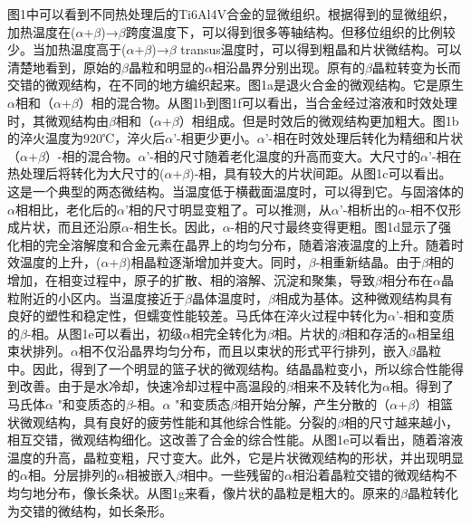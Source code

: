 图1中可以看到不同热处理后的Ti6Al4V合金的显微组织。根据得到的显微组织，加热温度在($\alpha$+$\beta$)→$\beta$跨度温度下，可以得到很多等轴结构。但移位组织的比例较少。当加热温度高于($\alpha$+$\beta$)→$\beta$ transus温度时，可以得到粗晶和片状微结构。可以清楚地看到，原始的$\beta$晶粒和明显的$\alpha$相沿晶界分别出现。原有的$\beta$晶粒转变为长而交错的微观结构，在不同的地方编织起来。图1a是退火合金的微观结构。它是原生$\alpha$相和（$\alpha$+$\beta$）相的混合物。从图1b到图1f可以看出，当合金经过溶液和时效处理时，其微观结构由$\beta$相和（$\alpha$+$\beta$）相组成。但是时效后的微观结构更加粗大。图1b的淬火温度为920℃，淬火后$\alpha$'-相更少更小。$\alpha$'-相在时效处理后转化为精细和片状（$\alpha$+$\beta$）-相的混合物。$\alpha$'-相的尺寸随着老化温度的升高而变大。大尺寸的$\alpha$'-相在热处理后将转化为大尺寸的($\alpha$+$\beta$)-相，具有较大的片状间距。从图1c可以看出。这是一个典型的两态微结构。当温度低于横截面温度时，可以得到它。与固溶体的$\alpha$相相比，老化后的$\alpha$'相的尺寸明显变粗了。可以推测，从$\alpha$'-相析出的$\alpha$-相不仅形成片状，而且还沿原$\alpha$-相生长。因此，$\alpha$-相的尺寸最终变得更粗。图1d显示了强化相的完全溶解度和合金元素在晶界上的均匀分布，随着溶液温度的上升。随着时效温度的上升，($\alpha$+$\beta$)相晶粒逐渐增加并变大。同时，$\beta$-相重新结晶。由于$\beta$相的增加，在相变过程中，原子的扩散、相的溶解、沉淀和聚集，导致$\beta$相分布在$\alpha$晶粒附近的小区内。当温度接近于$\beta$晶体温度时，$\beta$相成为基体。这种微观结构具有良好的塑性和稳定性，但蠕变性能较差。马氏体在淬火过程中转化为$\alpha$'-相和变质的$\beta$-相。从图1e可以看出，初级$\alpha$相完全转化为$\beta$相。片状的$\beta$相和存活的$\alpha$相呈组束状排列。$\alpha$相不仅沿晶界均匀分布，而且以束状的形式平行排列，嵌入$\beta$晶粒中。因此，得到了一个明显的篮子状的微观结构。结晶晶粒变小，所以综合性能得到改善。由于是水冷却，快速冷却过程中高温段的$\beta$相来不及转化为$\alpha$相。得到了马氏体$\alpha$ "和变质态的$\beta$-相。$\alpha$ "和变质态$\beta$相开始分解，产生分散的（$\alpha$+$\beta$）相篮状微观结构，具有良好的疲劳性能和其他综合性能。分裂的$\beta$相的尺寸越来越小，相互交错，微观结构细化。这改善了合金的综合性能。从图1e可以看出，随着溶液温度的升高，晶粒变粗，尺寸变大。此外，它是片状微观结构的形状，并出现明显的$\alpha$相。分层排列的$\alpha$相被嵌入$\beta$相中。一些残留的$\alpha$相沿着晶粒交错的微观结构不均匀地分布，像长条状。从图1g来看，像片状的晶粒是粗大的。原来的$\beta$晶粒转化为交错的微结构，如长条形。

